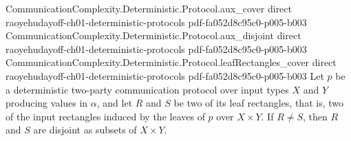 \begin{lemma}
  {CommunicationComplexity.Deterministic.Protocol.aux_cover}
  {direct}
  {raoyehudayoff-ch01-deterministic-protocols}
  {pdf-fa052d8c95c0-p005-b003}
\proofstep
  {CommunicationComplexity.Deterministic.Protocol.aux_disjoint}
  {direct}
  {raoyehudayoff-ch01-deterministic-protocols}
  {pdf-fa052d8c95c0-p005-b003}
\proofstep
  {CommunicationComplexity.Deterministic.Protocol.leafRectangles_cover}
  {direct}
  {raoyehudayoff-ch01-deterministic-protocols}
  {pdf-fa052d8c95c0-p005-b003}
Let $p$ be a deterministic two-party communication protocol over input types $X$ and $Y$
producing values in $\alpha$, and let $R$ and $S$ be two of its leaf rectangles, that
is, two of the input rectangles induced by the leaves of $p$ over $X \times Y$. If $R
\neq S$, then $R$ and $S$ are disjoint as subsets of $X \times Y$.
\end{lemma}

